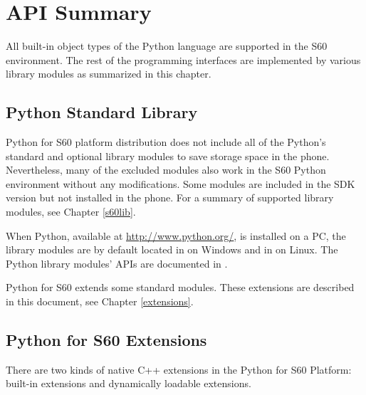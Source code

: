 %
%
%

\chapter{API Summary}
\label{sec:summary}

All built-in object types of the Python language are supported in the
S60 environment. The rest of the programming interfaces are
implemented by various library modules as summarized in this chapter.

\section{Python Standard Library}
\label{subsec:python}

Python for S60 platform distribution does not include all of the 
Python's standard and optional library modules to save storage space in the 
phone. Nevertheless, many of the excluded modules also work in the S60 
Python environment without any modifications. Some modules are included in 
the SDK version but not installed in the phone. For a summary of supported 
library modules, see Chapter \ref{s60lib}.

When Python, available at \url{http://www.python.org/}, is installed on a PC, the 
library modules are by default located in 
on Windows and in  on Linux. The Python library 
modules' APIs are documented in \cite{PyLibRef}.

Python for S60 extends some standard modules. These extensions are 
described in this document, see Chapter \ref{extensions}.

\section{Python for S60 Extensions}
\label{sec:sumext}

There are two kinds of native C++ extensions in the Python for S60 
Platform: built-in extensions and dynamically loadable extensions.

